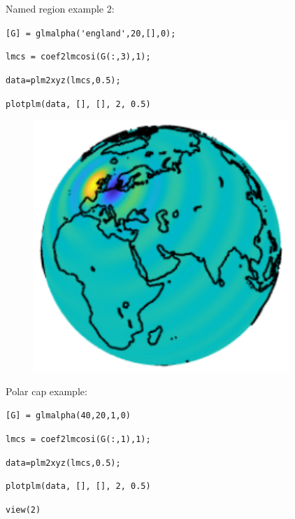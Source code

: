 \documentclass{article}
\begin{document}
\setlength{\parskip}{0.5cm plus4mm minus3mm}

Named region example 2:

\vspace{2mm}

\setlength{\parskip}{.1mm}

\verb![G] = glmalpha('england',20,[],0);!

\verb!lmcs = coef2lmcosi(G(:,3),1);!

\verb!data=plm2xyz(lmcs,0.5);!

\verb!plotplm(data, [], [], 2, 0.5)!

\begin{figure}[H]
\includegraphics[scale=1.2]{england_ex_2}
\end{figure}

\setlength{\parskip}{0.5cm plus4mm minus3mm}

Polar cap example:

\vspace{2mm}

\setlength{\parskip}{.1mm}

\verb![G] = glmalpha(40,20,1,0)!

\verb!lmcs = coef2lmcosi(G(:,1),1);!

\verb!data=plm2xyz(lmcs,0.5);!

\verb!plotplm(data, [], [], 2, 0.5)!

\verb!view(2)!
\end{document}
